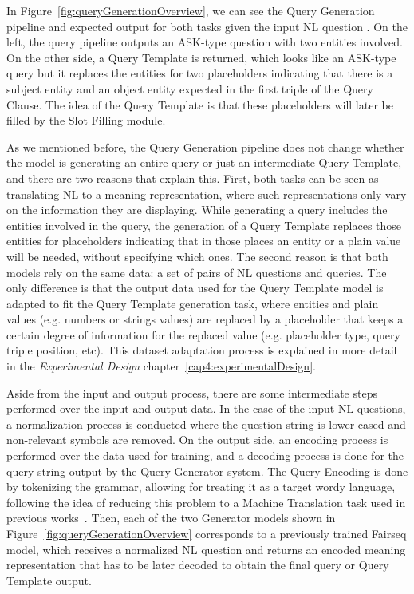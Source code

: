 In Figure~\ref{fig:queryGenerationOverview}, we can see the Query Generation pipeline and 
expected output for both tasks given the input NL question . On the left, the \SPARQL{} query pipeline outputs an ASK-type \SPARQL{} question with two 
entities involved. On the other side, a Query Template is returned, which looks like an 
ASK-type \SPARQL{} query but it replaces the entities for two placeholders indicating that there 
is a subject entity and an object entity expected in the first triple of the Query Clause. 
The idea of the Query Template is that these placeholders will later be filled by the Slot 
Filling module.

As we mentioned before, the Query Generation pipeline does not change whether the model is 
generating an entire \SPARQL{} query or just an intermediate Query Template, and there are two 
reasons that explain this. First, both tasks can be seen as translating NL to a meaning 
representation, where such representations only vary on the information they are displaying. 
While generating a \SPARQL{} query includes the entities involved in the query, the generation 
of a Query Template replaces those entities for placeholders indicating that in those places 
an entity or a plain value will be needed, without specifying which ones. The second reason 
is that both models rely on the same data: a set of pairs of NL questions and \SPARQL{} queries. 
The only difference is that the output data used for the Query Template model is adapted to 
fit the Query Template generation task, where entities and plain values (e.g. numbers or 
strings values) are replaced by a placeholder that keeps a certain degree of information for 
the replaced value (e.g. placeholder type, query triple position, etc). This dataset 
adaptation process is explained in more detail in the \textit{Experimental Design} chapter~\ref{cap4:experimentalDesign}.

Aside from the input and output process, there are some intermediate steps performed over the 
input and output data. In the case of the input NL questions, a normalization process is 
conducted where the question string is lower-cased and non-relevant symbols are removed. On 
the output side, an encoding process is performed over the data used for training, and a 
decoding process is done for the query string output by the Query Generator system. The Query 
Encoding is done by tokenizing the \SPARQL{} grammar, allowing for treating it as a target wordy 
language, following the idea of reducing this problem to a Machine Translation task used in 
previous works~\cite{semPar:ChoMGBBSB14, semPar:sempar-as-mt-AndreasVC13, nmt:nl-to-sparql-Yin19}. 
Then, each of the two Generator models shown in Figure~\ref{fig:queryGenerationOverview} 
corresponds to a previously trained Fairseq model, which receives a normalized NL question 
and returns an encoded meaning representation that has to be later decoded to obtain the 
final \SPARQL{} query or Query Template output.

